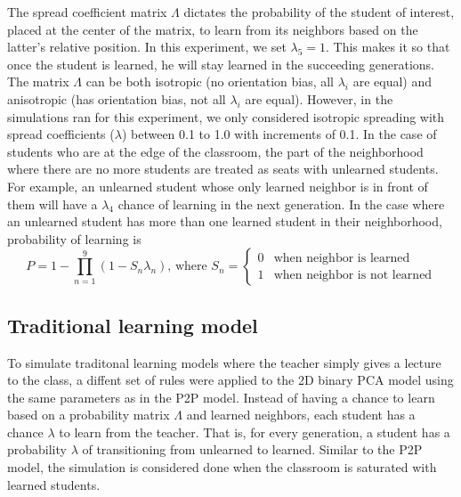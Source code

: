 \documentclass[10pt,a4paper,twoside]{article}
\begin{document}
\noindent The spread coefficient matrix $\Lambda$ dictates the probability of the student of interest, placed at the center of the matrix, to learn from its neighbors based on the latter's relative position. In this experiment, we set $\lambda_5 = 1$. This makes it so that once the student is learned, he will stay learned in the succeeding generations. The matrix $\Lambda$ can be both isotropic (no orientation bias, all $\lambda_i$ are equal) and anisotropic (has orientation bias, not all $\lambda_i$ are equal). However, in the simulations ran for this experiment, we only considered isotropic spreading with spread coefficients ($\lambda$) between 0.1 to 1.0 with increments of 0.1.  In the case of students who are at the edge of the classroom, the part of the neighborhood where there are no more students are treated as seats with unlearned students. For example, an unlearned student whose only learned neighbor is in front of them will have a $\lambda_4$ chance of learning in the next generation. In the case where an unlearned student has more than one learned student in their neighborhood, probability of learning is
\begin{equation}
  P = 1 - \prod_{n=1}^{9}{(1-S_n\lambda_n)}
  \text{, where } S_n=
  \begin{cases}
    0 & \text{when neighbor is learned}\\
    1 & \text{when neighbor is not learned}
  \end{cases}
  \label{eq:learning probability}
\end{equation}
\subsection{Traditional learning model}
To simulate traditonal learning models where the teacher simply gives a lecture to the class, a diffent set of rules were applied to the 2D binary PCA model using the same parameters as in the P2P model. Instead of having a chance to learn based on a probability matrix $\Lambda$ and learned neighbors, each student has a chance $\lambda$ to learn from the teacher. That is, for every generation, a student has a probability $\lambda$ of transitioning from unlearned to learned. Similar to the P2P model, the simulation is considered done when the classroom is saturated with learned students.
\end{document}

